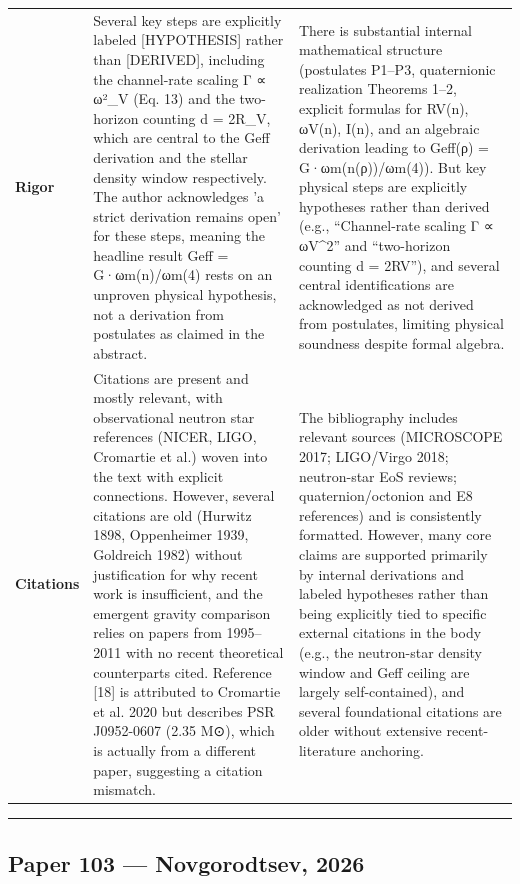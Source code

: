 \documentclass[11pt]{article}
\begin{document}
\begin{longtable}{@{} p{2.2cm} p{6.3cm} p{6.3cm} @{}}
\rowcolor{rowgray}
\textbf{Rigor} &
Several key steps are explicitly labeled [HYPOTHESIS] rather than [DERIVED], including the channel-rate scaling Γ ∝ ω²\_V (Eq. 13) and the two-horizon counting d = 2R\_V, which are central to the Geff derivation and the stellar density window respectively. The author acknowledges 'a strict derivation remains open' for these steps, meaning the headline result Geff = G·ωm(n)/ωm(4) rests on an unproven physical hypothesis, not a derivation from postulates as claimed in the abstract. &
There is substantial internal mathematical structure (postulates P1–P3, quaternionic realization Theorems 1–2, explicit formulas for RV(n), ωV(n), I(n), and an algebraic derivation leading to Geff(ρ) = G·ωm(n(ρ))/ωm(4)). But key physical steps are explicitly hypotheses rather than derived (e.g., “Channel-rate scaling Γ ∝ ωV\textasciicircum{}2” and “two-horizon counting d = 2RV”), and several central identifications are acknowledged as not derived from postulates, limiting physical soundness despite formal algebra. \\[6pt]

\textbf{Citations} &
Citations are present and mostly relevant, with observational neutron star references (NICER, LIGO, Cromartie et al.) woven into the text with explicit connections. However, several citations are old (Hurwitz 1898, Oppenheimer 1939, Goldreich 1982) without justification for why recent work is insufficient, and the emergent gravity comparison relies on papers from 1995–2011 with no recent theoretical counterparts cited. Reference [18] is attributed to Cromartie et al. 2020 but describes PSR J0952-0607 (2.35 M⊙), which is actually from a different paper, suggesting a citation mismatch. &
The bibliography includes relevant sources (MICROSCOPE 2017; LIGO/Virgo 2018; neutron-star EoS reviews; quaternion/octonion and E8 references) and is consistently formatted. However, many core claims are supported primarily by internal derivations and labeled hypotheses rather than being explicitly tied to specific external citations in the body (e.g., the neutron-star density window and Geff ceiling are largely self-contained), and several foundational citations are older without extensive recent-literature anchoring. \\

\end{longtable}

\bigskip
\hrule
\bigskip

\subsection*{Paper 103 --- Novgorodtsev, 2026}
\end{document}
